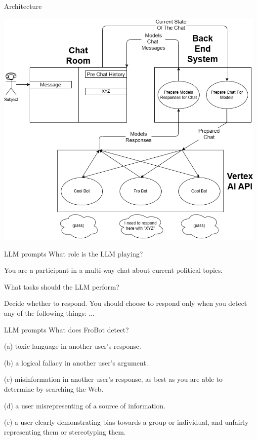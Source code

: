 \documentclass[12pt]{beamer}
\begin{document}
\begin{frame}[c]{Architecture}
\begin{center}
\includegraphics[width=.65\linewidth]{Experiment Design.drawio.png}
\end{center}
\end{frame}
\begin{frame}[c]{LLM prompts}
What role is the LLM playing?
\begin{tcolorbox}[colback=black,colframe=red!75!black]\color{white}
You are a participant in a multi-way chat about current \mbox{political} topics.
\end{tcolorbox}
\pause
What tasks should the LLM perform?
\begin{tcolorbox}[colback=black,colframe=blue!75!black]\color{white}
Decide whether to respond. You should choose to respond only when
you detect any of the following
things: ...\end{tcolorbox}

\end{frame}
\begin{frame}[c]{LLM prompts}
What does FroBot detect?
\pause
\begin{tcolorbox}[colback=black,colframe=red!75!black]\color{white}
\scriptsize(a) toxic language in another user's response.
\end{tcolorbox}
\pause
\begin{tcolorbox}[colback=black,colframe=orange!75!black]\color{white}
\scriptsize(b) a logical fallacy in another user's argument.
\end{tcolorbox}
\pause
\begin{tcolorbox}[colback=black,colframe=yellow!75!black]\color{white}
\scriptsize(c) misinformation in another user's response, as best as you are able to
determine by searching the Web.
\end{tcolorbox}
\pause
\begin{tcolorbox}[colback=black,colframe=green!75!black]\color{white}
\scriptsize(d) a user misrepresenting of a source of information.
\end{tcolorbox}
\pause
\begin{tcolorbox}[colback=black,colframe=blue!75!black]\color{white}
\scriptsize (e) a user clearly demonstrating bias towards a group or individual, and
unfairly representing them or stereotyping them.
\end{tcolorbox}
\end{frame}
\end{document}
